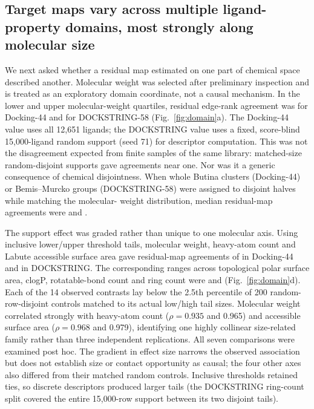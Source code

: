 \documentclass[11pt]{article}
\begin{document}
\subsection{Target maps vary across multiple ligand-property domains, most strongly along molecular size}

We next asked whether a residual map estimated on one part of chemical space
described another. Molecular weight was selected after preliminary inspection
and is treated as an exploratory domain coordinate, not a causal mechanism. In
the lower and upper molecular-weight quartiles, residual edge-rank agreement was
\DffMWQuartileRho{} for Docking-44 and \DsMWQuartileRho{} for
DOCKSTRING-58 (Fig.~\ref{fig:domain}a). The Docking-44 value uses all 12,651
ligands; the DOCKSTRING value uses a fixed, score-blind 15,000-ligand random support
(seed 71) for descriptor computation. This was not the disagreement expected
from finite samples of the same library: matched-size random-disjoint supports
gave agreements near one. Nor was it a generic consequence of chemical
disjointness. When whole Butina clusters (Docking-44) or Bemis--Murcko groups
(DOCKSTRING-58) were assigned to disjoint halves while matching the molecular-
weight distribution, median residual-map agreements were
\DffMWMatchedControlRho{} and \DsMWMatchedControlRho{}.

The support effect was graded rather than unique to one molecular axis. Using
inclusive lower/upper threshold tails, molecular weight, heavy-atom
count and Labute accessible surface area gave residual-map agreements of
\DffSizeAxisRhoRange{} in Docking-44 and \DsSizeAxisRhoRange{} in
DOCKSTRING. The corresponding ranges across topological polar surface area,
clogP, rotatable-bond count and ring count were \DffOtherAxisRhoRange{} and
\DsOtherAxisRhoRange{} (Fig.~\ref{fig:domain}d). Each of the 14 observed
contrasts lay below the 2.5th percentile of 200 random-row-disjoint controls
matched to its actual low/high tail sizes. Molecular weight correlated
strongly with heavy-atom count ($\rho=0.935$ and 0.965) and accessible surface
area ($\rho=0.968$ and 0.979), identifying one highly collinear size-related
family rather than three independent replications. All seven comparisons were
examined post hoc. The gradient in effect size narrows the observed association
but does not establish size or contact opportunity as causal; the four other
axes also differed from their matched random controls. Inclusive thresholds
retained ties, so discrete descriptors produced larger tails (the DOCKSTRING
ring-count split covered the entire 15,000-row support between its two disjoint
tails).
\end{document}
